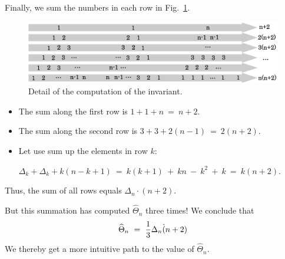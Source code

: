 Finally, we sum the numbers in each row in Fig.~\ref{fig:Tetrahedral4}.
\begin{figure}[h]
\begin{center}
        \includegraphics[scale=0.32]{FiguresArithmetic/appTetrahedral4}
        \caption{Detail of the computation of the invariant.}
        \label{fig:Tetrahedral4}
\end{center}
\end{figure}
\begin{itemize}
\item 
The sum along the first row is  $1+1+n \ = \ n+2$.
\item
The sum along the second row is $3 + 3 + 2 (n-1) \ = \ 2(n+2)$. 
\item
Let use sum up the elements in row $k$: 

$\Delta_k + \Delta_k + k(n-k+1) \ = \ k(k+1) \ + \ kn \ - \ k^2 \ + \ k \ = \  k(n+2)$.
\end{itemize}
Thus, the sum of all rows equals $\Delta_n \cdot (n+2)$.

\smallskip

But this summation has computed $\widehat{\Theta}_n$ three times!  We conclude that
\[ \widehat{\Theta}_n \ = \ {1 \over 3} \Delta_n \dot (n+2) \]
We thereby get a more intuitive path to the value of $\widehat{\Theta}_n$.

\medskip

